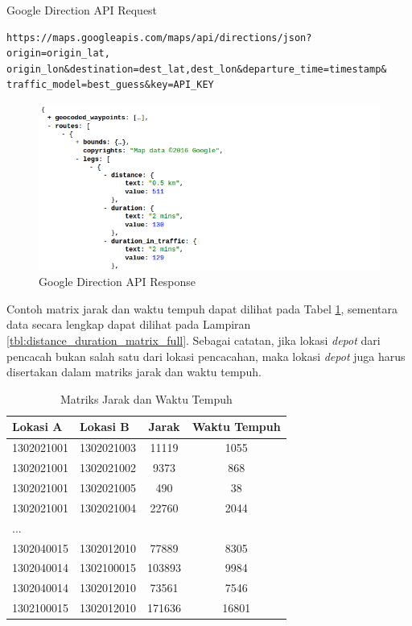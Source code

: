 \begin{listing}[!]
	\caption{Google Direction API Request}
	\label{lst:google_direction_api_request}
	\begin{verbatim}
https://maps.googleapis.com/maps/api/directions/json?origin=origin_lat,
origin_lon&destination=dest_lat,dest_lon&departure_time=timestamp&
traffic_model=best_guess&key=API_KEY
	\end{verbatim}
\end{listing}


\begin{figure}[!]
	\centering
	\includegraphics[width=\textwidth]{../../Resources/Images/google_direction_api_response}
	\caption{Google Direction API Response}
	\label{fig:google_direction_api_response}
\end{figure}


Contoh matrix jarak dan waktu tempuh dapat dilihat pada Tabel \ref{tbl:distance_duration_matrix}, sementara data secara lengkap dapat dilihat pada Lampiran \ref{tbl:distance_duration_matrix_full}. Sebagai catatan, jika lokasi \textit{depot} dari pencacah bukan salah satu dari lokasi pencacahan, maka lokasi \textit{depot} juga harus disertakan dalam matriks jarak dan waktu tempuh.


\begin{table}[!]
	\centering
	\caption{Matriks Jarak dan Waktu Tempuh}
	\label{tbl:distance_duration_matrix}
	\begin{tabular}{llcc}
		\toprule
			Lokasi A & Lokasi B & Jarak & Waktu Tempuh\\
		\midrule
			1302021001 & 1302021003 & 11119 & 1055\\
			1302021001 & 1302021002 & 9373 & 868\\
			1302021001 & 1302021005 & 490 & 38\\
			1302021001 & 1302021004 & 22760 & 2044\\
			...\\
			1302040015 & 1302012010 & 77889 & 8305\\
			1302040014 & 1302100015 & 103893 & 9984\\
			1302040014 & 1302012010 & 73561 & 7546\\
			1302100015 & 1302012010 & 171636 & 16801\\
		\bottomrule
	\end{tabular}
\end{table}


